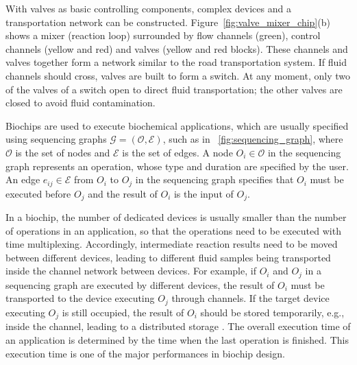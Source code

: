 With valves as basic controlling components, complex devices and
a transportation network can be constructed.
Figure~\ref{fig:valve_mixer_chip}(b) shows a mixer (reaction loop) surrounded
by flow channels (green), control channels (yellow and red) and valves (yellow
and red blocks). These channels and valves together form a network similar to
the road transportation system. If fluid channels should cross, valves are
built to form a switch. 
At any moment, only two of the valves of a switch open to direct fluid
transportation; the other valves are closed to avoid fluid contamination.  

Biochips are used to execute biochemical applications, which are usually
specified using sequencing graphs $\mathcal{G}=(\mathcal{O},\mathcal{E})$,
such as in \figname~\ref{fig:sequencing_graph}, where $\mathcal{O}$ is the set
of nodes 
and $\mathcal{E}$ is the set of edges. 
A node $O_i \in \mathcal{O}$ in the sequencing graph represents an operation,
whose type and duration are specified by the user.  An edge
$e_{ij}\in \mathcal{E}$ from $O_i$ to $O_j$ in the sequencing graph specifies
that $O_i$ must be executed before $O_j$ and the result of $O_i$ is the input
of $O_j$. 

In a biochip, the number of dedicated devices is usually smaller than the
number of operations in an application, so that the operations need to be
executed with time multiplexing. 
Accordingly, intermediate reaction results need to be moved between different
devices, leading to different fluid samples being transported inside the
channel network between devices.  For example, if $O_i$ and $O_j$ in a
sequencing graph are executed by different devices, 
the result of $O_i$ must be transported to the device executing $O_j$ through
channels.  If the target device executing $O_j$ is still occupied, the result
of $O_i$ should be stored temporarily, e.g., inside the channel, leading to a
distributed storage \cite{TsengLSH15,Liu2017}. The overall execution time of an
application is determined by the time when the last operation is finished.
This execution time is one of the major performances in biochip design.


